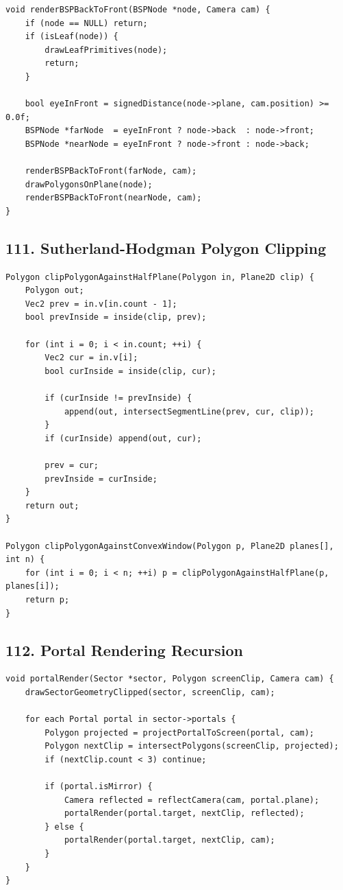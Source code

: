 \documentclass[10pt,letterpaper]{article}
\begin{document}
\begin{verbatim}
void renderBSPBackToFront(BSPNode *node, Camera cam) {
    if (node == NULL) return;
    if (isLeaf(node)) {
        drawLeafPrimitives(node);
        return;
    }

    bool eyeInFront = signedDistance(node->plane, cam.position) >= 0.0f;
    BSPNode *farNode  = eyeInFront ? node->back  : node->front;
    BSPNode *nearNode = eyeInFront ? node->front : node->back;

    renderBSPBackToFront(farNode, cam);
    drawPolygonsOnPlane(node);
    renderBSPBackToFront(nearNode, cam);
}
\end{verbatim}

\subsection{111. Sutherland-Hodgman Polygon Clipping}

\begin{verbatim}
Polygon clipPolygonAgainstHalfPlane(Polygon in, Plane2D clip) {
    Polygon out;
    Vec2 prev = in.v[in.count - 1];
    bool prevInside = inside(clip, prev);

    for (int i = 0; i < in.count; ++i) {
        Vec2 cur = in.v[i];
        bool curInside = inside(clip, cur);

        if (curInside != prevInside) {
            append(out, intersectSegmentLine(prev, cur, clip));
        }
        if (curInside) append(out, cur);

        prev = cur;
        prevInside = curInside;
    }
    return out;
}

Polygon clipPolygonAgainstConvexWindow(Polygon p, Plane2D planes[], int n) {
    for (int i = 0; i < n; ++i) p = clipPolygonAgainstHalfPlane(p, planes[i]);
    return p;
}
\end{verbatim}

\subsection{112. Portal Rendering Recursion}

\begin{verbatim}
void portalRender(Sector *sector, Polygon screenClip, Camera cam) {
    drawSectorGeometryClipped(sector, screenClip, cam);

    for each Portal portal in sector->portals {
        Polygon projected = projectPortalToScreen(portal, cam);
        Polygon nextClip = intersectPolygons(screenClip, projected);
        if (nextClip.count < 3) continue;

        if (portal.isMirror) {
            Camera reflected = reflectCamera(cam, portal.plane);
            portalRender(portal.target, nextClip, reflected);
        } else {
            portalRender(portal.target, nextClip, cam);
        }
    }
}
\end{verbatim}
\end{document}
